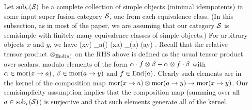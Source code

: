 

Let $\text{sob}_r(\mathcal{S})$ be a complete collection of simple objects (minimal idempotents) in some 
input super fusion category $\mathcal{S}$, one from each equivalence class.
(In this subsection, as in most of the paper, we are assuming that our category $\mathcal{S}$ is semisimple with finitely many equivalence
classes of simple objects.)
For arbitrary objects $x$ and $y$, we have
\be \label{sobdecomp}
	\mor(x\to y) \: \cong \: \bigoplus_{a\in\sob(\spc)} \mor(x\to a) \tp_{\End(a)} \mor(a\to y) .
\ee
Recall that the relative tensor product $\otimes_{\text{End}(a)}$ on the RHS above is defined as the usual tensor product over scalars, modulo elements
of the form $\alpha \cdot f \otimes \beta - \alpha\otimes f \cdot \beta$ with $\alpha \in \text{mor}(x \to a)$, $\beta \in \text{mor}(a \to y)$ and $f\in \text{End}(a)$.
Clearly such elements are in the kernel of the composition map $\text{mor}(x\to a) \otimes \text{mor}(a\to y) \to \text{mor}(x\to y)$.
Our semisimplicity assumption implies that the composition map (summing over all $a\in \text{sob}_r(\mathcal{S})$) is surjective and that such
elements generate all of the kernel.

